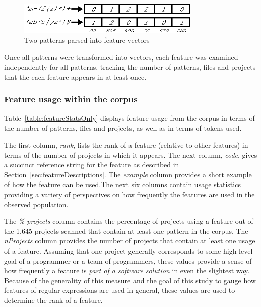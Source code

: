 \begin{figure}[tb]
\centering
\includegraphics[height=0.6in]{nontex/illustrations/featureParsing.eps}
\caption{Two patterns parsed into feature vectors}
\label{fig:featureParsing}
\vspace{-12pt}
\end{figure}

Once all patterns were transformed into vectors, each feature was examined independently for all patterns, tracking the number of patterns, files and projects that the each feature appears in at least once.



\subsubsection{Feature usage within the corpus}
Table~\ref{table:featureStatsOnly} displays feature usage from the corpus in terms of the number of patterns, files and projects, as well as in terms of tokens used.

The first column, \emph{rank}, lists the rank of a feature (relative to other features) in terms of the number of projects in which it appears. The next column, \emph{code}, gives a succinct reference string for the feature as described in Section~\ref{sec:featureDescriptions}. The \emph{example} column provides a short example of how the feature can be used.The next six columns contain usage statistics providing a variety of perspectives on how frequently the features are used in the observed population.

The \emph{\% projects} column contains the percentage of projects  using a feature out of the 1,645 projects scanned that contain at least one pattern in the corpus.  The \emph{nProjects} column provides the number of projects that contain at least one usage of a feature.  Assuming that one project generally corresponds to some high-level goal of a programmer or a team of programmers, these values provide a sense of how frequently a feature is \emph{part of a software solution} in even the slightest way.  Because of the generality of this measure and the goal of this study to gauge how features of regular expressions are used in general, these values are used to determine the rank of a feature.

